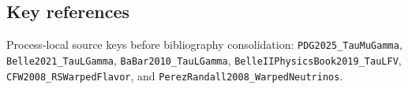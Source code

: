 \subsection*{Key references}
Process-local source keys before bibliography consolidation:
\texttt{PDG2025\_TauMuGamma}, \texttt{Belle2021\_TauLGamma},
\texttt{BaBar2010\_TauLGamma}, \texttt{BelleIIPhysicsBook2019\_TauLFV},
\texttt{CFW2008\_RSWarpedFlavor}, and
\texttt{PerezRandall2008\_WarpedNeutrinos}.
